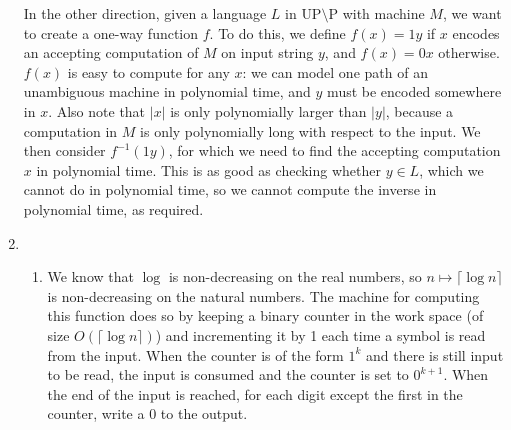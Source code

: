 \documentclass{article}
\begin{document}
\begin{enumerate}
    In the other direction, given a language $L$ in $\textrm{UP} \setminus \textrm{P}$ with machine $M$, we want to create a one-way function $f$. To do this, we define $f(x) = 1y$ if $x$ encodes an accepting computation of $M$ on input string $y$, and $f(x) = 0x$ otherwise. $f(x)$ is easy to compute for any $x$: we can model one path of an unambiguous machine in polynomial time, and $y$ must be encoded somewhere in $x$. Also note that $\lvert x \rvert$ is only polynomially larger than $\lvert y \rvert$, because a computation in $M$ is only polynomially long with respect to the input. We then consider $f^{-1}(1y)$, for which we need to find the accepting computation $x$ in polynomial time. This is as good as checking whether $y \in L$, which we cannot do in polynomial time, so we cannot compute the inverse in polynomial time, as required.
  \item
    \begin{enumerate}
      \item We know that $\log$ is non-decreasing on the real numbers, so $n \mapsto \lceil \log n \rceil$ is non-decreasing on the natural numbers. The machine for computing this function does so by keeping a binary counter in the work space (of size $O(\lceil \log n \rceil)$) and incrementing it by 1 each time a symbol is read from the input. When the counter is of the form $1^k$ and there is still input to be read, the input is consumed and the counter is set to $0^{k+1}$. When the end of the input is reached, for each digit except the first in the counter, write a $0$ to the output.


\end{enumerate}
\end{enumerate}
\end{document}
